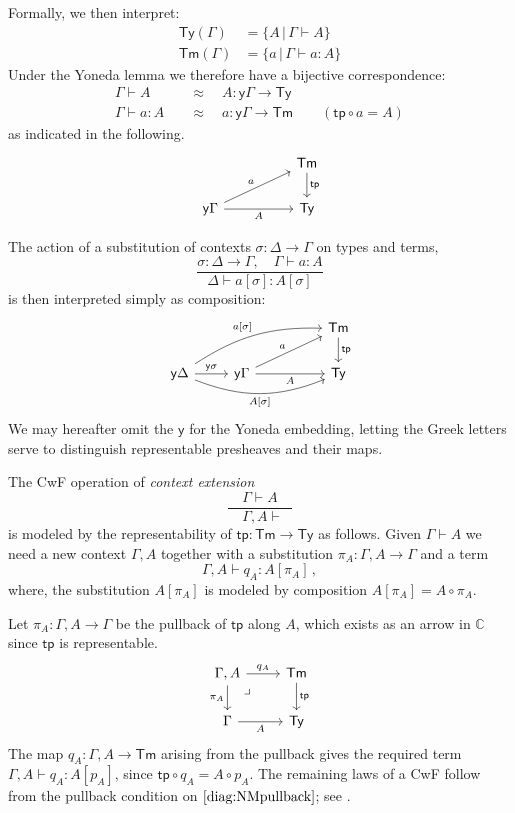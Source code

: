 \documentclass[12pt]{article}
\newcommand{\C}{\ensuremath{\mathbb{C}}}
\newcommand{\y}{\ensuremath{\mathsf{y}}} %
\newcommand{\tp}{\ensuremath{\mathsf{tp}}}
\newcommand{\Tm}{\ensuremath{\mathsf{Tm}}}
\newcommand{\Ty}{\ensuremath{\mathsf{Ty}}}
\renewcommand{\to}{\ensuremath{\rightarrow}}
\newcommand{\G}{\ensuremath{\Gamma}}
\newcommand{\terms}[2]{#1 \vdash #2}
\newcommand{\Gterms}[1]{\terms{\Gamma}{#1}}
\newcommand{\ext}[2]{{#1,#2}}
\newcommand{\pbcorner}{\arrow[dr,phantom,"\lrcorner" very near start, shift right=.5ex]} %
\theoremstyle{remark}
\theoremstyle{definition}
\begin{document}
Formally, we then interpret:
\begin{align*}
 \Ty(\Gamma) &= \{ A \,|\, \Gamma \vdash A\} \\
 \Tm(\Gamma) &= \{ a \,|\, \Gamma \vdash a:A\} 
\end{align*}
Under the Yoneda lemma we therefore have a bijective correspondence:
\begin{align*}
\Gamma\vdash A\quad &\approx\quad A : \y{\Gamma}\to \Ty  \\
\Gterms{a:A}\quad &\approx\quad  a: \y{\Gamma}\to \Tm  \qquad (\tp\circ a = A)
\end{align*}
as indicated in the following.
\[
\begin{tikzcd}
 	&&  {\Tm} \ar[d,"{\tp}"]\\
\y\Gamma \ar[rru, "a"]   \ar[rr ,swap,  "A"]   && {\Ty}
\end{tikzcd}
\]
%

The action of a substitution of contexts $\sigma : \Delta \to \Gamma$ on types and terms,
\[
\frac{\sigma: \Delta \to \Gamma, \quad \Gamma\vdash a:A}{\Delta\vdash a[\sigma] : A[\sigma]}
\]
is then interpreted simply as composition:
\[
\begin{tikzcd}
 	&&&  {\Tm} \ar[d,"{\tp}"]\\
\y{\Delta} \ar[r,  "\y{\sigma}"] \ar[rrru, bend left = 4ex, "{a[\sigma]}"] \ar[rrr, swap, bend right = 5ex, "{A[\sigma]}"] & \y\Gamma \ar[rru, "a"]   \ar[rr ,swap,  "A"]  && {\Ty}
\end{tikzcd}
\]
%
We may hereafter omit the $\y$ for the Yoneda embedding, letting the Greek letters serve to distinguish representable presheaves and their maps.

The CwF operation of \emph{context extension} 
$$\frac{\quad\Gamma\vdash A\quad}{\ \ \ext{\G}{A}\vdash}$$
is modeled by the representability of $\tp : \Tm\to\Ty$ as follows.
%
Given $\Gamma\vdash A$ we need a new context $\ext{\G}{A}$ together with a substitution $\pi_A : \ext{\G}{A} \to \G$ and a term 
\[
\terms{\ext{\G}{A}}{q_A:A[\pi_A]}\,,
\]
where, the substitution $A[\pi_A]$ is modeled by composition $A[\pi_A] = A\circ \pi_A$.

Let $\pi_A: \ext{\G}{A} \to \G$ be the pullback of $\tp$ along $A$, which exists as an arrow in $\C$ since $\tp$ is representable.
%
\begin{equation}\label{diag:NMpullback}
\begin{tikzcd}
{\ext{\G}{A}} \ar[d,swap, "{\pi_A}"] \ar[r, "{q_A}"] \pbcorner &  {\Tm} \ar[d, "{\tp}"]\\
{\G} \ar[r,swap,"A"]   & {\Ty}
\end{tikzcd}
\end{equation}
%
The map $q_A : \ext{\G}{A}\to\Tm$ arising from the pullback gives the required term $\terms{\ext{\G}{A}}{q_A:A[p_A]}$, since $\tp\circ q_A = A \circ p_A$.
The remaining laws of a CwF follow from the pullback condition on $\eqref{diag:NMpullback}$; see \cite{Awodey:NM}.
\end{document}
